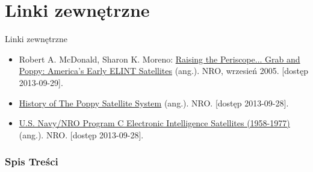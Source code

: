 \documentclass{beamer}
\begin{document}
\section{Linki zewnętrzne}
\begin{frame}{Linki zewnętrzne}
\begin{itemize}
\item{Robert A. McDonald, Sharon K. Moreno: \href{http://www.nro.gov/history/csnr/programs/docs/prog-hist-03.pdf}{Raising the Periscope... Grab and Poppy: America's Early ELINT Satellites} (ang.). NRO, wrzesień 2005. [dostęp 2013-09-29].}
\item{\href{http://www.nro.gov/foia/} {History of The Poppy Satellite System} (ang.). NRO. [dostęp 2013-09-28].}
\item{\href{http://www.nro.gov/foia/docs/U.S.\%20Navy-NRO\%20Program\%20C\%20Electronic\%20Intelligence\%20Satellites\%20\%281958-1977\%29.pdf}{U.S. Navy/NRO Program C Electronic Intelligence Satellites (1958-1977)} (ang.). NRO. [dostęp 2013-09-28].}
\end{itemize}
\end{frame}

\begin{frame}
\frametitle{Spis Treści}
\tableofcontents
\end{frame}
\end{document}
